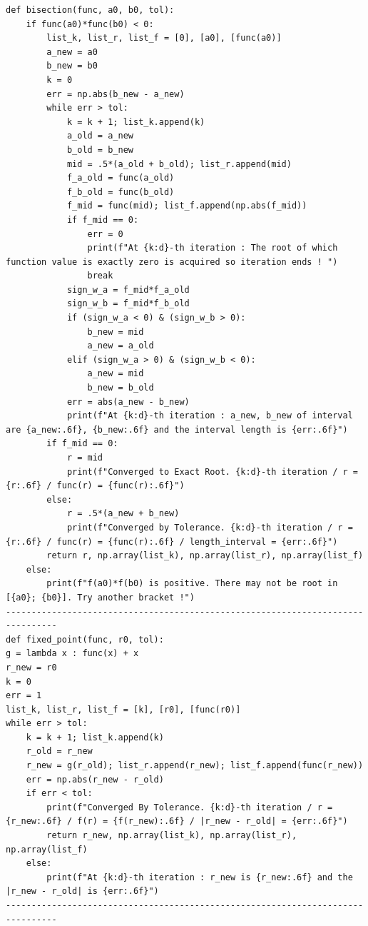 \documentclass{article} %
\begin{document}
\lstset{style=pythonstyle}
\begin{lstlisting}[title={Root-Finding Methods(Bisection, Fixed-point iteration, Newton's, Secant) in Python}]
def bisection(func, a0, b0, tol):
    if func(a0)*func(b0) < 0:
        list_k, list_r, list_f = [0], [a0], [func(a0)]
        a_new = a0
        b_new = b0
        k = 0
        err = np.abs(b_new - a_new)
        while err > tol:
            k = k + 1; list_k.append(k)
            a_old = a_new
            b_old = b_new
            mid = .5*(a_old + b_old); list_r.append(mid)
            f_a_old = func(a_old)
            f_b_old = func(b_old)
            f_mid = func(mid); list_f.append(np.abs(f_mid))
            if f_mid == 0:
                err = 0
                print(f"At {k:d}-th iteration : The root of which function value is exactly zero is acquired so iteration ends ! ")
                break
            sign_w_a = f_mid*f_a_old
            sign_w_b = f_mid*f_b_old
            if (sign_w_a < 0) & (sign_w_b > 0):
                b_new = mid
                a_new = a_old
            elif (sign_w_a > 0) & (sign_w_b < 0):
                a_new = mid
                b_new = b_old
            err = abs(a_new - b_new)
            print(f"At {k:d}-th iteration : a_new, b_new of interval are {a_new:.6f}, {b_new:.6f} and the interval length is {err:.6f}")
        if f_mid == 0:
            r = mid
            print(f"Converged to Exact Root. {k:d}-th iteration / r = {r:.6f} / func(r) = {func(r):.6f}")
        else:
            r = .5*(a_new + b_new)
            print(f"Converged by Tolerance. {k:d}-th iteration / r = {r:.6f} / func(r) = {func(r):.6f} / length_interval = {err:.6f}")
        return r, np.array(list_k), np.array(list_r), np.array(list_f)
    else:
        print(f"f(a0)*f(b0) is positive. There may not be root in [{a0}; {b0}]. Try another bracket !")
--------------------------------------------------------------------------------
def fixed_point(func, r0, tol):
g = lambda x : func(x) + x
r_new = r0
k = 0
err = 1
list_k, list_r, list_f = [k], [r0], [func(r0)]
while err > tol:
    k = k + 1; list_k.append(k)
    r_old = r_new
    r_new = g(r_old); list_r.append(r_new); list_f.append(func(r_new))
    err = np.abs(r_new - r_old)
    if err < tol:
        print(f"Converged By Tolerance. {k:d}-th iteration / r = {r_new:.6f} / f(r) = {f(r_new):.6f} / |r_new - r_old| = {err:.6f}")
        return r_new, np.array(list_k), np.array(list_r), np.array(list_f)
    else:
        print(f"At {k:d}-th iteration : r_new is {r_new:.6f} and the |r_new - r_old| is {err:.6f}")
--------------------------------------------------------------------------------

\end{lstlisting}
\end{document}
